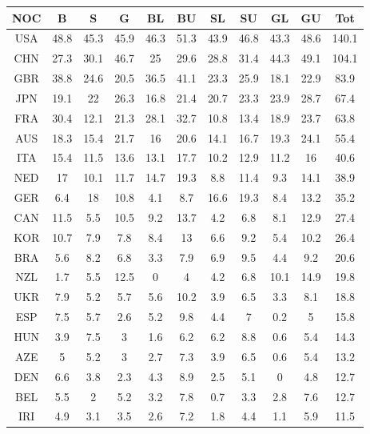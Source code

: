 \documentclass{mcmthesis}
\begin{document}
\begin{table}[htbp]
    \centering
    \begin{tabular}{|c|c|c|c|c|c|c|c|c|c|c|}
        \hline
        NOC & B & S & G & BL & BU & SL & SU & GL & GU & Tot \\
        \hline
        USA & 48.8 & 45.3 & 45.9 & 46.3 & 51.3 & 43.9 & 46.8 & 43.3 & 48.6 & 140.1 \\
        CHN & 27.3 & 30.1 & 46.7 & 25 & 29.6 & 28.8 & 31.4 & 44.3 & 49.1 & 104.1 \\
        GBR & 38.8 & 24.6 & 20.5 & 36.5 & 41.1 & 23.3 & 25.9 & 18.1 & 22.9 & 83.9 \\
        JPN & 19.1 & 22 & 26.3 & 16.8 & 21.4 & 20.7 & 23.3 & 23.9 & 28.7 & 67.4 \\
        FRA & 30.4 & 12.1 & 21.3 & 28.1 & 32.7 & 10.8 & 13.4 & 18.9 & 23.7 & 63.8 \\
        AUS & 18.3 & 15.4 & 21.7 & 16 & 20.6 & 14.1 & 16.7 & 19.3 & 24.1 & 55.4 \\
        ITA & 15.4 & 11.5 & 13.6 & 13.1 & 17.7 & 10.2 & 12.9 & 11.2 & 16 & 40.6 \\
        NED & 17 & 10.1 & 11.7 & 14.7 & 19.3 & 8.8 & 11.4 & 9.3 & 14.1 & 38.9 \\
        GER & 6.4 & 18 & 10.8 & 4.1 & 8.7 & 16.6 & 19.3 & 8.4 & 13.2 & 35.2 \\
        CAN & 11.5 & 5.5 & 10.5 & 9.2 & 13.7 & 4.2 & 6.8 & 8.1 & 12.9 & 27.4 \\
        KOR & 10.7 & 7.9 & 7.8 & 8.4 & 13 & 6.6 & 9.2 & 5.4 & 10.2 & 26.4 \\
        BRA & 5.6 & 8.2 & 6.8 & 3.3 & 7.9 & 6.9 & 9.5 & 4.4 & 9.2 & 20.6 \\
        NZL & 1.7 & 5.5 & 12.5 & 0 & 4 & 4.2 & 6.8 & 10.1 & 14.9 & 19.8 \\
        UKR & 7.9 & 5.2 & 5.7 & 5.6 & 10.2 & 3.9 & 6.5 & 3.3 & 8.1 & 18.8 \\
        ESP & 7.5 & 5.7 & 2.6 & 5.2 & 9.8 & 4.4 & 7 & 0.2 & 5 & 15.8 \\
        HUN & 3.9 & 7.5 & 3 & 1.6 & 6.2 & 6.2 & 8.8 & 0.6 & 5.4 & 14.3 \\
        AZE & 5 & 5.2 & 3 & 2.7 & 7.3 & 3.9 & 6.5 & 0.6 & 5.4 & 13.2 \\
        DEN & 6.6 & 3.8 & 2.3 & 4.3 & 8.9 & 2.5 & 5.1 & 0 & 4.8 & 12.7 \\
        BEL & 5.5 & 2 & 5.2 & 3.2 & 7.8 & 0.7 & 3.3 & 2.8 & 7.6 & 12.7 \\
        IRI & 4.9 & 3.1 & 3.5 & 2.6 & 7.2 & 1.8 & 4.4 & 1.1 & 5.9 & 11.5 \\

\end{tabular}
\end{table}
\end{document}
